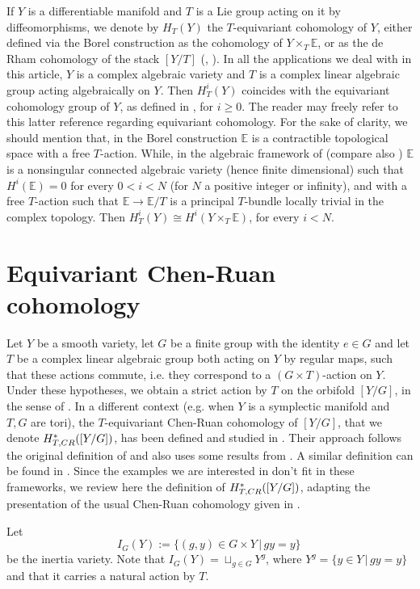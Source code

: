 \documentclass[10pt,a4paper]{amsart}
\newcommand{\E}{\mathbb{E}}
\newcommand{\1}{\mathds{1}}   %
\begin{document}
If $Y$ is a differentiable manifold and $T$ is a Lie group acting on it by diffeomorphisms, 
we denote by $H_T(Y)$ the $T$-equivariant cohomology of $Y$,
either defined via the Borel construction as the cohomology of $Y\times_T \E$, 
or as the de Rham cohomology of the stack $[Y/T]$ (\cite{Beh04}, \cite[Ch. 2]{BGNX}). 
In all the applications we deal with in this article, $Y$ is a complex algebraic variety and $T$ is a complex linear algebraic group
acting algebraically on $Y$. Then $H^i_T(Y)$ coincides with the equivariant cohomology group of $Y$, as defined in 
\cite{AF}, for $i\geq 0$. The reader may freely refer to this latter reference regarding equivariant cohomology.
For the sake of clarity, we should mention that, in the Borel construction $\E$ is a contractible topological space
with a free $T$-action. While, in the algebraic framework of \cite{AF} (compare also \cite{EG}) $\E$ is a nonsingular 
connected algebraic variety (hence finite dimensional) such that $H^i(\E)=0$ for every $0<i<N$ (for $N$ a positive integer or infinity),
and with a free $T$-action such that $\E \to \E/T$ is a principal $T$-bundle locally trivial in the complex topology.
Then $H_T^i(Y) \cong H^i(Y\times_T \E)$, for every $i<N$.



\bigskip

\section{Equivariant Chen-Ruan cohomology}\label{ecrc}
Let $Y$ be a smooth variety, let $G$ be a finite group with the identity $e\in G$ and let $T$ be a complex linear algebraic group 
both acting on $Y$ by regular maps, 
such that these actions commute, i.e. they correspond to a $(G\times T)$-action on $Y$.
Under these hypotheses, we obtain  a strict action by $T$ on the orbifold $[Y/G]$, in the sense of \cite{Romagny}.
In a different context (e.g. when $Y$ is a symplectic manifold and $T, G$ are tori),
the $T$-equivariant Chen-Ruan cohomology of $[Y/G]$, that we denote  $H^*_{T, \rm{CR}}([Y/G])$, 
has been defined and studied in \cite{HoMa}. Their approach follows the original definition of \cite{CR04}
and also uses some results from \cite{AGV08}. A similar definition can be found in \cite{Johnson}. 
Since the examples we are interested in don't fit in these frameworks, we review here the
definition of  $H^*_{T, \rm{CR}}([Y/G])$, adapting the presentation of the usual Chen-Ruan cohomology given in \cite{FG03}.

Let 
$$
I_G(Y):= \{ (g, y) \in G\times Y \, | \, gy=y\} \, 
$$
be the inertia variety. Note that $I_G(Y)= \sqcup_{g\in G}Y^g$, where $Y^g= \{ y\in Y \, | \, g y = y\}$
and that it carries a natural action by $T$.
\end{document}
